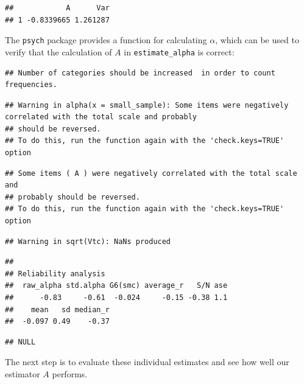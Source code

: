 \documentclass[
]{book}
\newenvironment{Shaded}{\begin{snugshade}}{\end{snugshade}}
\newcommand{\AttributeTok}[1]{\textcolor[rgb]{0.77,0.63,0.00}{#1}}
\newcommand{\FunctionTok}[1]{\textcolor[rgb]{0.00,0.00,0.00}{#1}}
\newcommand{\NormalTok}[1]{#1}
\newcommand{\SpecialCharTok}[1]{\textcolor[rgb]{0.00,0.00,0.00}{#1}}
\begin{document}
\begin{verbatim}
##            A      Var
## 1 -0.8339665 1.261287
\end{verbatim}

The \texttt{psych} package provides a function for calculating \(\alpha\), which can be used to verify that the calculation of \(A\) in \texttt{estimate\_alpha} is correct:

\begin{Shaded}
\end{Shaded}

\begin{verbatim}
## Number of categories should be increased  in order to count frequencies.
\end{verbatim}

\begin{verbatim}
## Warning in alpha(x = small_sample): Some items were negatively correlated with the total scale and probably 
## should be reversed.  
## To do this, run the function again with the 'check.keys=TRUE' option
\end{verbatim}

\begin{verbatim}
## Some items ( A ) were negatively correlated with the total scale and 
## probably should be reversed.  
## To do this, run the function again with the 'check.keys=TRUE' option
\end{verbatim}

\begin{verbatim}
## Warning in sqrt(Vtc): NaNs produced
\end{verbatim}

\begin{verbatim}
## 
## Reliability analysis   
##  raw_alpha std.alpha G6(smc) average_r   S/N ase
##      -0.83     -0.61  -0.024     -0.15 -0.38 1.1
##    mean   sd median_r
##  -0.097 0.49    -0.37
\end{verbatim}

\begin{verbatim}
## NULL
\end{verbatim}

The next step is to evaluate these individual estimates and see how well our estimator \(A\) performs.
\end{document}
